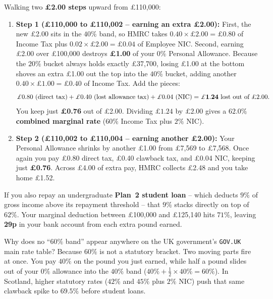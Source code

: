 Walking two \textbf{\pounds 2.00 steps} upward from \pounds 110,000:
\begin{enumerate}
  \item \textbf{Step 1 (\pounds 110,000 to \pounds 110,002 -- earning an extra \pounds 2.00):} First, the new \pounds 2.00 sits in the $40\%$ band, so HMRC takes \textbf{$0.40 \times \pounds 2.00 = \pounds 0.80$} of Income Tax plus \textbf{$0.02 \times \pounds 2.00 = \pounds 0.04$} of Employee NIC. Second, earning \pounds 2.00 over \pounds 100,000 destroys \textbf{\pounds 1.00} of your $0\%$ Personal Allowance. Because the $20\%$ bucket always holds exactly \pounds 37,700, losing \pounds 1.00 at the bottom shoves an extra \pounds 1.00 out the top into the $40\%$ bucket, adding another \textbf{$0.40 \times \pounds 1.00 = \pounds 0.40$} of Income Tax. Add the pieces:
  \[
    \pounds 0.80 \text{ (direct tax)} + \pounds 0.40 \text{ (lost allowance tax)} + \pounds 0.04 \text{ (NIC)} = \mathbf{\pounds 1.24} \text{ lost out of \pounds 2.00.}
  \]
  You keep just \textbf{\pounds 0.76} out of \pounds 2.00. Dividing $\pounds 1.24$ by $\pounds 2.00$ gives a \textbf{$62.0\%$ combined marginal rate} ($60\%$ Income Tax plus $2\%$ NIC).
  \item \textbf{Step 2 (\pounds 110,002 to \pounds 110,004 -- earning another \pounds 2.00):} Your Personal Allowance shrinks by another \pounds 1.00 from \pounds 7,569 to \pounds 7,568. Once again you pay \pounds 0.80 direct tax, \pounds 0.40 clawback tax, and \pounds 0.04 NIC, keeping just \textbf{\pounds 0.76}. Across \pounds 4.00 of extra pay, HMRC collects \pounds 2.48 and you take home \pounds 1.52.
\end{enumerate}

If you also repay an undergraduate \textbf{Plan~2 student loan} -- which deducts $9\%$ of gross income above its repayment threshold -- that $9\%$ stacks directly on top of $62\%$. Your marginal deduction between \pounds 100,000 and \pounds 125,140 hits \textbf{$71\%$}, leaving \textbf{29p} in your bank account from each extra pound earned.

\begin{happeningbox}
Why does no ``$60\%$ band'' appear anywhere on the UK government's \texttt{GOV.UK} main rate table? Because $60\%$ is not a statutory bracket. Two moving parts fire at once. You pay $40\%$ on the pound you just earned, while half a pound slides out of your $0\%$ allowance into the $40\%$ band ($40\% + \tfrac{1}{2}\times 40\% = 60\%$). In Scotland, higher statutory rates ($42\%$ and $45\%$ plus $2\%$ NIC) push that same clawback spike to \textbf{$69.5\%$} before student loans.
\end{happeningbox}

